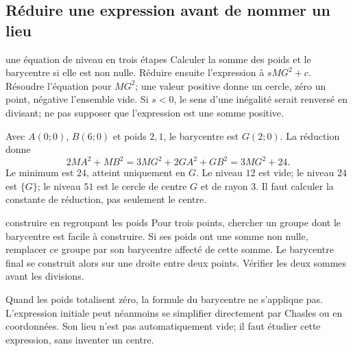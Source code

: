 \subsection*{Réduire une expression avant de nommer un lieu}
\begin{methode}{une équation de niveau en trois étapes}
Calculer la somme des poids et le barycentre si elle est non nulle. Réduire ensuite l’expression à $sMG^2+c$. Résoudre l’équation pour $MG^2$; une valeur positive donne un cercle, zéro un point, négative l’ensemble vide. Si $s<0$, le sens d’une inégalité serait renversé en divisant; ne pas supposer que l’expression est une somme positive.
\end{methode}
\begin{exemple}
Avec $A(0;0)$, $B(6;0)$ et poids $2,1$, le barycentre est $G(2;0)$. La réduction donne
\[
2MA^2+MB^2=3MG^2+2GA^2+GB^2=3MG^2+24.
\]
Le minimum est $24$, atteint uniquement en $G$. Le niveau $12$ est vide; le niveau $24$ est $\{G\}$; le niveau $51$ est le cercle de centre $G$ et de rayon $3$. Il faut calculer la constante de réduction, pas seulement le centre.
\end{exemple}
\begin{methode}{construire en regroupant les poids}
Pour trois points, chercher un groupe dont le barycentre est facile à construire. Si ses poids ont une somme non nulle, remplacer ce groupe par son barycentre affecté de cette somme. Le barycentre final se construit alors sur une droite entre deux points. Vérifier les deux sommes avant les divisions.
\end{methode}
\begin{remarque}
Quand les poids totalisent zéro, la formule du barycentre ne s’applique pas. L’expression initiale peut néanmoins se simplifier directement par Chasles ou en coordonnées. Son lieu n’est pas automatiquement vide; il faut étudier cette expression, sans inventer un centre.
\end{remarque}

